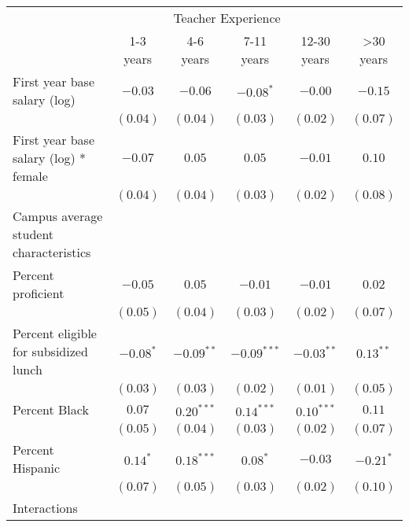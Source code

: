 \documentclass[]{article}
\begin{document}
\begin{table}
\begin{center}
\begin{tabular}{l c c c c c }
\hline
 & \multicolumn{4}{c}{Teacher Experience} \\ \cline{2-6}
 & 1-3 years & 4-6 years & 7-11 years & 12-30 years & >30 years \\
\hline
First year base salary (log)                & $-0.03$      & $-0.06$      & $-0.08^{*}$   & $-0.00$      & $-0.15$     \\
                                            & $(0.04)$     & $(0.04)$     & $(0.03)$      & $(0.02)$     & $(0.07)$    \\
First year base salary (log) * female       & $-0.07$      & $0.05$       & $0.05$        & $-0.01$      & $0.10$      \\
                                            & $(0.04)$     & $(0.04)$     & $(0.03)$      & $(0.02)$     & $(0.08)$    \\
Campus average student characteristics      &              &              &               &              &             \\
\quad Percent proficient                    & $-0.05$      & $0.05$       & $-0.01$       & $-0.01$      & $0.02$      \\
                                            & $(0.05)$     & $(0.04)$     & $(0.03)$      & $(0.02)$     & $(0.07)$    \\
\quad Percent eligible for subsidized lunch & $-0.08^{*}$  & $-0.09^{**}$ & $-0.09^{***}$ & $-0.03^{**}$ & $0.13^{**}$ \\
                                            & $(0.03)$     & $(0.03)$     & $(0.02)$      & $(0.01)$     & $(0.05)$    \\
\quad Percent Black                         & $0.07$       & $0.20^{***}$ & $0.14^{***}$  & $0.10^{***}$ & $0.11$      \\
                                            & $(0.05)$     & $(0.04)$     & $(0.03)$      & $(0.02)$     & $(0.07)$    \\
\quad Percent Hispanic                      & $0.14^{*}$   & $0.18^{***}$ & $0.08^{*}$    & $-0.03$      & $-0.21^{*}$ \\
                                            & $(0.07)$     & $(0.05)$     & $(0.03)$      & $(0.02)$     & $(0.10)$    \\
Interactions                                &              &              &               &              &             \\

\end{tabular}
\end{center}
\end{table}
\end{document}
